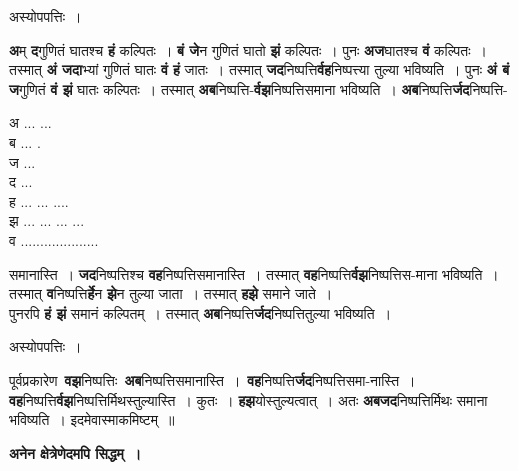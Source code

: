 \documentclass[11pt, openany]{book}
\begin{document}
\begin{center}
अस्योपपत्तिः~।
\end{center}

\begin{flushleft}
\begin{minipage}[t]{0.67\textwidth}
\hspace{4mm} \textbf{अ}म् \textbf{द}गुणितं घातश्च \textbf{हं} कल्पितः~। \textbf{बं जे}न गुणितं घातो \;\textbf{झं} \;\;कल्पितः~। \;पुनः \;\textbf{अज}घातश्च \;\;\textbf{वं} \;कल्पितः~। तस्मात् \textbf{अं जदा}भ्यां गुणितं घातः \textbf{वं हं} जातः~। तस्मात् \textbf{जद}निष्पत्ति\textbf{र्वह}निष्पत्त्या तुल्या भविष्यति~। पुनः \textbf{अं बं ज}गुणितं \textbf{वं झं} घातः कल्पितः~। तस्मात् \textbf{अब}निष्पत्ति-\textbf{र्वझ}निष्पत्तिसमाना भविष्यति~। \textbf{अब}निष्पत्ति\textbf{र्जद}निष्पत्ति-
\end{minipage} 
\hfill
\begin{minipage}[t]{0.23\textwidth}
\vspace{-8mm}

अ ... ...\\
ब ... .\\
ज ...\\
द ...\\
ह ... ... ....\\
झ ... ... ... ...\\
व ....................
\end{minipage}
\end{flushleft}

\newpage
\noindent समानास्ति~। \textbf{जद}निष्पत्तिश्च \textbf{वह}निष्पत्तिसमानास्ति~। तस्मात् \textbf{वह}निष्पत्ति\textbf{र्वझ}निष्पत्तिस-माना भविष्यति~। तस्मात् \textbf{व}निष्पत्ति\textbf{र्हे}न \textbf{झे}न तुल्या जाता~। तस्मात् \textbf{हझे} समाने जाते~। \\

पुनरपि \textbf{हं झं} समानं कल्पितम्~। तस्मात् \textbf{अब}निष्पत्ति\textbf{र्जद}निष्पत्तितुल्या भविष्यति~। 

\begin{center}
अस्योपपत्तिः~।
\end{center}

पूर्वप्रकारेण \,\textbf{वझ}निष्पत्तिः \,\textbf{अब}निष्पत्तिसमानास्ति~। \,\textbf{वह}निष्पत्ति\textbf{र्जद}निष्पत्तिसमा-नास्ति~। \textbf{वह}निष्पत्ति\textbf{र्वझ}निष्पत्तिर्मिथस्तुल्यास्ति~। कुतः~। \textbf{हझ}योस्तुल्यत्वात्~। अतः \textbf{अबजद}निष्पत्तिर्मिथः समाना भविष्यति~। इदमेवास्माकमिष्टम्~॥ 

\begin{center}
\textbf{अनेन क्षेत्रेणेदमपि सिद्धम्~। }
\end{center}
\end{document}
